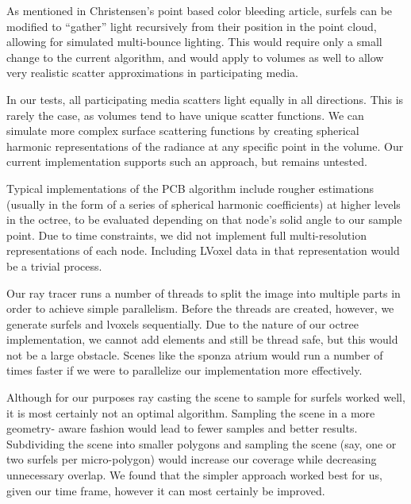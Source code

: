 \documentclass[12pt]{ucthesis}
\begin{document}
As mentioned in Christensen's point based color bleeding article, surfels can be modified to ``gather'' light recursively from their position in the point cloud, allowing for simulated multi-bounce lighting.  This would require only a small change to the current algorithm, and would apply to volumes as well to allow very realistic scatter approximations in participating media.

\vspace{5mm}

In our tests, all participating media scatters light equally in all directions.  This is rarely the case, as volumes tend to have unique scatter functions.  We can simulate more complex surface scattering functions by creating spherical harmonic representations of the radiance at any specific point in the volume.  Our current implementation supports such an approach, but remains untested.

\vspace{5mm}

Typical implementations of the PCB algorithm include rougher estimations (usually in the form of a series of spherical harmonic coefficients) at higher levels in the octree, to be evaluated depending on that node's solid angle to our sample point.  Due to time constraints, we did not implement full multi-resolution representations of each node.  Including LVoxel data in that representation would be a trivial process.

\vspace{5mm}

Our ray tracer runs a number of threads to split the image into multiple parts  in order to achieve simple parallelism.  Before the threads are created, however, we generate surfels and lvoxels sequentially.  Due to the nature of our octree implementation, we cannot add elements and still be thread safe, but this would not be a large obstacle.  Scenes like the sponza atrium would run a number of times faster if we were to parallelize our implementation more effectively.

\vspace{5mm}

Although for our purposes ray casting the scene to sample for surfels worked well, it is most certainly not an optimal algorithm.  Sampling the scene in a more geometry- aware fashion would lead to fewer samples and better results.  Subdividing the scene into smaller polygons and sampling the scene (say, one or two surfels per micro-polygon) would increase our coverage while decreasing unnecessary overlap.  We found that the simpler approach worked best for us, given our time frame, however it can most certainly be improved.
\end{document}
